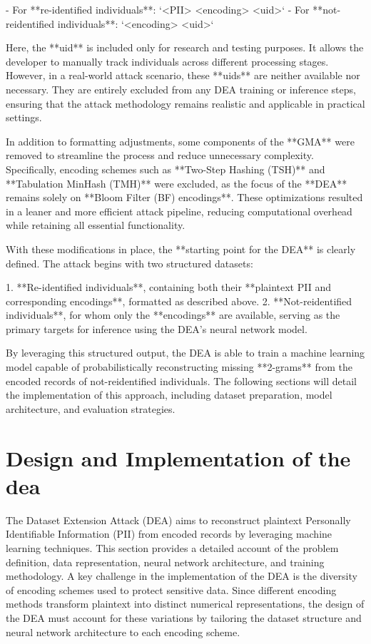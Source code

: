 - For **re-identified individuals**: `<PII> <encoding> <uid>`
- For **not-reidentified individuals**: `<encoding> <uid>`

Here, the **uid** is included only for research and testing purposes. It allows the developer to manually track individuals across different processing stages. However, in a real-world attack scenario, these **uids** are neither available nor necessary. They are entirely excluded from any DEA training or inference steps, ensuring that the attack methodology remains realistic and applicable in practical settings.

In addition to formatting adjustments, some components of the **GMA** were removed to streamline the process and reduce unnecessary complexity. Specifically, encoding schemes such as **Two-Step Hashing (TSH)** and **Tabulation MinHash (TMH)** were excluded, as the focus of the **DEA** remains solely on **Bloom Filter (BF) encodings**. These optimizations resulted in a leaner and more efficient attack pipeline, reducing computational overhead while retaining all essential functionality.

With these modifications in place, the **starting point for the DEA** is clearly defined. The attack begins with two structured datasets:

1. **Re-identified individuals**, containing both their **plaintext PII and corresponding encodings**, formatted as described above.
2. **Not-reidentified individuals**, for whom only the **encodings** are available, serving as the primary targets for inference using the DEA’s neural network model.

By leveraging this structured output, the DEA is able to train a machine learning model capable of probabilistically reconstructing missing **2-grams** from the encoded records of not-reidentified individuals. The following sections will detail the implementation of this approach, including dataset preparation, model architecture, and evaluation strategies.

\section{Design and Implementation of the \ac{dea}} \label{sec:designandimplementation}

The Dataset Extension Attack (DEA) aims to reconstruct plaintext Personally Identifiable Information (PII) from encoded records by leveraging machine learning techniques. This section provides a detailed account of the problem definition, data representation, neural network architecture, and training methodology. A key challenge in the implementation of the DEA is the diversity of encoding schemes used to protect sensitive data. Since different encoding methods transform plaintext into distinct numerical representations, the design of the DEA must account for these variations by tailoring the dataset structure and neural network architecture to each encoding scheme.

